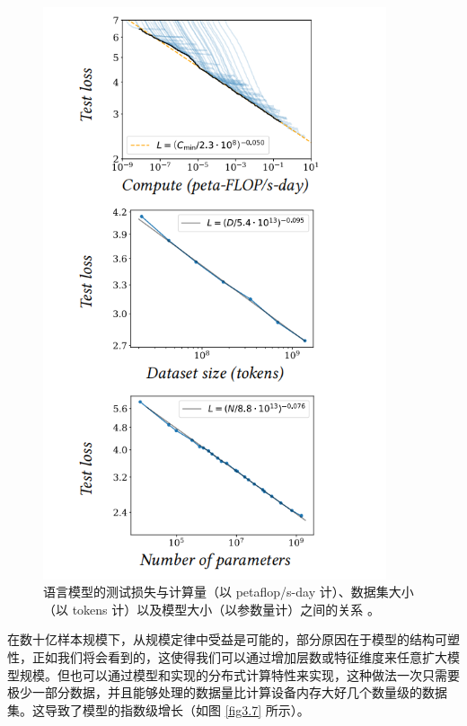 \begin{figure}
    \centering
    \includegraphics[width=0.9\textwidth]{fig/fig3.6.png}
    \caption[规模定律]{语言模型的测试损失与计算量（以 petaflop/s-day 计）、数据集大小（以 tokens 计）以及模型大小（以参数量计）之间的关系 \citep{arxiv-2001.08361}。}
    \label{fig3.6}
\end{figure}

在数十亿样本规模下，从规模定律中受益是可能的，部分原因在于模型的结构可塑性，正如我们将会看到的，这使得我们可以通过增加层数或特征维度来任意扩大模型规模。但也可以通过模型和实现的分布式计算特性来实现，这种做法一次只需要极少一部分数据，并且能够处理的数据量比计算设备内存大好几个数量级的数据集。这导致了模型的指数级增长（如图 \ref{fig3.7} 所示）。

